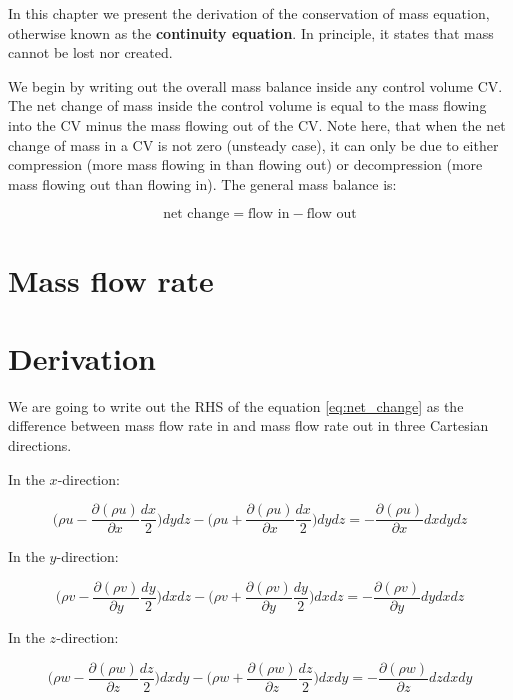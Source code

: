 In this chapter we present the derivation of the conservation of mass equation, otherwise known as the \textbf{continuity equation}. In principle, it states that mass cannot be lost nor created.

We begin by writing out the overall mass balance inside any control volume CV. The net change of mass inside the control volume is equal to the mass flowing into the CV minus the mass flowing out of the CV. Note here, that when the net change of mass in a CV is not zero (unsteady case), it can only be due to either compression (more mass flowing in than flowing out) or decompression (more mass flowing out than flowing in). The general mass balance is:

\begin{equation} \label{eq:net_change}
\text{net change} = \text{flow in} - \text{flow out}
\end{equation}

\section{Mass flow rate}

\section{Derivation}

We are going to write out the RHS of the equation \ref{eq:net_change} as the difference between mass flow rate in and mass flow rate out in three Cartesian directions.

In the $x$-direction:

\begin{equation}
\Big( \rho u - \frac{\partial (\rho u)}{\partial x} \frac{dx}{2} \Big) dy dz - \Big( \rho u + \frac{\partial (\rho u)}{\partial x} \frac{dx}{2} \Big) dy dz = - \frac{\partial (\rho u)}{\partial x} dx dy dz
\end{equation}

In the $y$-direction:

\begin{equation}
\Big( \rho v - \frac{\partial (\rho v)}{\partial y} \frac{dy}{2} \Big) dx dz - \Big( \rho v + \frac{\partial (\rho v)}{\partial y} \frac{dy}{2} \Big) dx dz = - \frac{\partial (\rho v)}{\partial y} dy dx dz
\end{equation}

In the $z$-direction:

\begin{equation}
\Big( \rho w - \frac{\partial (\rho w)}{\partial z} \frac{dz}{2} \Big) dx dy - \Big( \rho w + \frac{\partial (\rho w)}{\partial z} \frac{dz}{2} \Big) dx dy = - \frac{\partial (\rho w)}{\partial z} dz dx dy
\end{equation}

